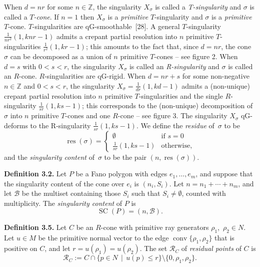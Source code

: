 When $d=nr$ for some $n\in\mathbb{Z}$, the singularity $X_\sigma$ is called a \emph{T-singularity} and $\sigma$ is called a \emph{$T$-cone}. If $n=1$ then $X_\sigma$ is a \emph{primitive} $T$-singularity and $\sigma$ is a \emph{primitive} $T$-cone. $T$-singularities are qG-smoothable~\textup{[28]}. A general $T$-singularity $\frac{1}{n r^2}(1, knr-1)$ admits a crepant partial resolution into $n$ primitive $T$-singularities $\frac{1}{r^2}(1, kr-1)$; this amounts to the fact that, since $d = n r$, the cone $\sigma$ can be decomposed as a union of $n$ primitive $T$-cones -- see figure 2.
When $d = s$ with $0 < s < r$, the singularity $X_\sigma$ is called an \emph{R-singularity} and $\sigma$ is called an $R$-cone. $R$-singularities are qG-rigid. When $d = nr+s$ for some non-negative $n \in \mathbb{Z}$ and $0 < s < r$, the singularity $X_\sigma = \frac{1}{dr}(1, kd-1)$ admits a (non-unique) crepant partial resolution into $n$ primitive $T$-singularities and the single $R$-singularity $\frac{1}{sr}(1,ks-1)$; this corresponds to the (non-unique) decomposition of $\sigma$ into $n$ primitive $T$-cones and one $R$-cone -- see figure 3.
\noindent The singularity $X_\sigma$ qG-deforms to the R-singularity $\frac{1}{sr}(1,ks-1)$. We define the \emph{residue} of~$\sigma$ to be
\[
\operatorname{res}(\sigma)=\begin{cases}
\emptyset&\text{if $s=0$}\\
\frac{1}{sr}(1,ks-1)&\text{otherwise,}
\end{cases}
\]
and the \emph{singularity content} of~$\sigma$ to be the pair $(n,\operatorname{res}(\sigma))$.


\par\noindent\textbf{Definition 3.2.} 
Let $P$ be a Fano polygon with edges $e_1,\ldots,e_m$, and suppose that the singularity content of the cone over $e_i$ is $(n_i, S_i)$. Let $n = n_1 + \cdots + n_m$, and let $\mathcal{B}$ be the multiset containing those $S_i$ such that $S_i \ne \emptyset$, counted with multiplicity. The \emph{singularity content} of $P$ is
\[
\operatorname{SC}(P)=(n, \mathcal{B}).
\]

\par

\par\noindent\textbf{Definition 3.5.} 
Let $C$ be an $R$-cone with primitive ray generators $\rho_1$,~$\rho_2 \in N$. Let $u \in M$ be the primitive normal vector to the edge $\operatorname{conv}\{\rho_1,\rho_2\}$ that is positive on $C$, and let $r = u(\rho_1) = u(\rho_2)$. The set $\mathcal{R}_C$ of \emph{residual points} of $C$ is
\[
\mathcal{R}_C := C \cap \{p \in N \, \mid \, u(p) \leq r\} \setminus \{0, \rho_1, \rho_2\}.
\]

